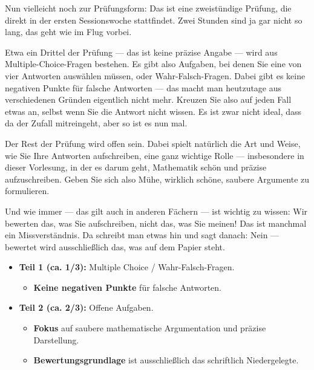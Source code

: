 \begin{spoken-clean}[01:11:39 - 01:14:09]
Nun vielleicht noch zur Prüfungsform: Das ist eine zweistündige Prüfung, die direkt in der ersten Sessionswoche stattfindet. Zwei Stunden sind ja gar nicht so lang, das geht wie im Flug vorbei.

Etwa ein Drittel der Prüfung --- das ist keine präzise Angabe --- wird aus Multiple-Choice-Fragen bestehen. Es gibt also Aufgaben, bei denen Sie eine von vier Antworten auswählen müssen, oder Wahr-Falsch-Fragen. Dabei gibt es keine negativen Punkte für falsche Antworten --- das macht man heutzutage aus verschiedenen Gründen eigentlich nicht mehr. Kreuzen Sie also auf jeden Fall etwas an, selbst wenn Sie die Antwort nicht wissen. Es ist zwar nicht ideal, dass da der Zufall mitreingeht, aber so ist es nun mal.

Der Rest der Prüfung wird offen sein. Dabei spielt natürlich die Art und Weise, wie Sie Ihre Antworten aufschreiben, eine ganz wichtige Rolle --- insbesondere in dieser Vorlesung, in der es darum geht, Mathematik schön und präzise aufzuschreiben. Geben Sie sich also Mühe, wirklich schöne, saubere Argumente zu formulieren. 

Und wie immer --- das gilt auch in anderen Fächern --- ist wichtig zu wissen: Wir bewerten das, was Sie aufschreiben, nicht das, was Sie meinen! Das ist manchmal ein Missverständnis. Da schreibt man etwas hin und sagt danach:  Nein --- bewertet wird ausschließlich das, was auf dem Papier steht.
\end{spoken-clean}

\begin{math-stroke}[Prüfungsaufbau]
\begin{itemize}
    \item \textbf{Teil 1 (ca. 1/3):} Multiple Choice / Wahr-Falsch-Fragen.
    \begin{itemize}
        \item \textbf{Keine negativen Punkte} für falsche Antworten.
    \end{itemize}
    \item \textbf{Teil 2 (ca. 2/3):} Offene Aufgaben.
    \begin{itemize}
        \item \textbf{Fokus} auf saubere mathematische Argumentation und präzise Darstellung.
        \item \textbf{Bewertungsgrundlage} ist ausschließlich das schriftlich Niedergelegte.
    \end{itemize}
\end{itemize}
\end{math-stroke}


